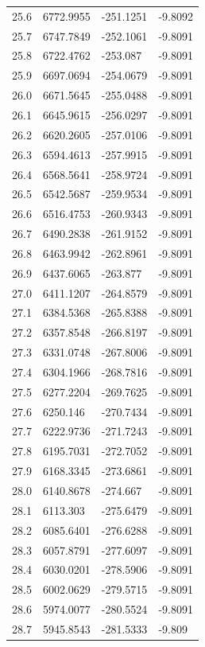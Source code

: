 \begin{table}[H]
\begin{tabular}{llll}
25.6 & 6772.9955 & -251.1251 & -9.8092 \\
25.7 & 6747.7849 & -252.1061 & -9.8091 \\
25.8 & 6722.4762 & -253.087 & -9.8091 \\
25.9 & 6697.0694 & -254.0679 & -9.8091 \\
26.0 & 6671.5645 & -255.0488 & -9.8091 \\
26.1 & 6645.9615 & -256.0297 & -9.8091 \\
26.2 & 6620.2605 & -257.0106 & -9.8091 \\
26.3 & 6594.4613 & -257.9915 & -9.8091 \\
26.4 & 6568.5641 & -258.9724 & -9.8091 \\
26.5 & 6542.5687 & -259.9534 & -9.8091 \\
26.6 & 6516.4753 & -260.9343 & -9.8091 \\
26.7 & 6490.2838 & -261.9152 & -9.8091 \\
26.8 & 6463.9942 & -262.8961 & -9.8091 \\
26.9 & 6437.6065 & -263.877 & -9.8091 \\
27.0 & 6411.1207 & -264.8579 & -9.8091 \\
27.1 & 6384.5368 & -265.8388 & -9.8091 \\
27.2 & 6357.8548 & -266.8197 & -9.8091 \\
27.3 & 6331.0748 & -267.8006 & -9.8091 \\
27.4 & 6304.1966 & -268.7816 & -9.8091 \\
27.5 & 6277.2204 & -269.7625 & -9.8091 \\
27.6 & 6250.146 & -270.7434 & -9.8091 \\
27.7 & 6222.9736 & -271.7243 & -9.8091 \\
27.8 & 6195.7031 & -272.7052 & -9.8091 \\
27.9 & 6168.3345 & -273.6861 & -9.8091 \\
28.0 & 6140.8678 & -274.667 & -9.8091 \\
28.1 & 6113.303 & -275.6479 & -9.8091 \\
28.2 & 6085.6401 & -276.6288 & -9.8091 \\
28.3 & 6057.8791 & -277.6097 & -9.8091 \\
28.4 & 6030.0201 & -278.5906 & -9.8091 \\
28.5 & 6002.0629 & -279.5715 & -9.8091 \\
28.6 & 5974.0077 & -280.5524 & -9.8091 \\
28.7 & 5945.8543 & -281.5333 & -9.809 \\

\end{tabular}
\end{table}
